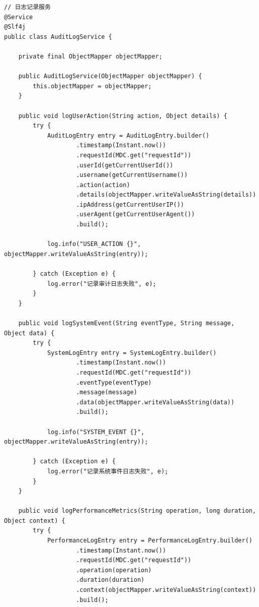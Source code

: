 \begin{lstlisting}[style=java]
// 日志记录服务
@Service
@Slf4j
public class AuditLogService {
    
    private final ObjectMapper objectMapper;
    
    public AuditLogService(ObjectMapper objectMapper) {
        this.objectMapper = objectMapper;
    }
    
    public void logUserAction(String action, Object details) {
        try {
            AuditLogEntry entry = AuditLogEntry.builder()
                    .timestamp(Instant.now())
                    .requestId(MDC.get("requestId"))
                    .userId(getCurrentUserId())
                    .username(getCurrentUsername())
                    .action(action)
                    .details(objectMapper.writeValueAsString(details))
                    .ipAddress(getCurrentUserIP())
                    .userAgent(getCurrentUserAgent())
                    .build();
                    
            log.info("USER_ACTION {}", objectMapper.writeValueAsString(entry));
            
        } catch (Exception e) {
            log.error("记录审计日志失败", e);
        }
    }
    
    public void logSystemEvent(String eventType, String message, Object data) {
        try {
            SystemLogEntry entry = SystemLogEntry.builder()
                    .timestamp(Instant.now())
                    .requestId(MDC.get("requestId"))
                    .eventType(eventType)
                    .message(message)
                    .data(objectMapper.writeValueAsString(data))
                    .build();
                    
            log.info("SYSTEM_EVENT {}", objectMapper.writeValueAsString(entry));
            
        } catch (Exception e) {
            log.error("记录系统事件日志失败", e);
        }
    }
    
    public void logPerformanceMetrics(String operation, long duration, Object context) {
        try {
            PerformanceLogEntry entry = PerformanceLogEntry.builder()
                    .timestamp(Instant.now())
                    .requestId(MDC.get("requestId"))
                    .operation(operation)
                    .duration(duration)
                    .context(objectMapper.writeValueAsString(context))
                    .build();
                    

\end{lstlisting}
